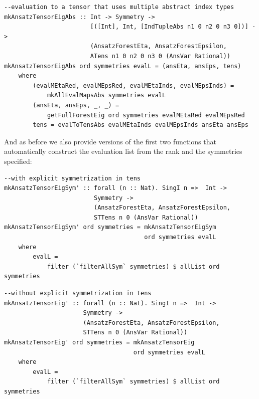 \documentclass[a4paper,12pt, DIV=14, BCOR=5mm, twoside, headsepline]{scrbook}
\begin{document}
\begin{samepage}
\begin{verbatim}
--evaluation to a tensor that uses multiple abstract index types
mkAnsatzTensorEigAbs :: Int -> Symmetry ->
                        [([Int], Int, [IndTupleAbs n1 0 n2 0 n3 0])] ->
                        (AnsatzForestEta, AnsatzForestEpsilon,
                        ATens n1 0 n2 0 n3 0 (AnsVar Rational))
mkAnsatzTensorEigAbs ord symmetries evalL = (ansEta, ansEps, tens)
    where
        (evalMEtaRed, evalMEpsRed, evalMEtaInds, evalMEpsInds) =
            mkAllEvalMapsAbs symmetries evalL 
        (ansEta, ansEps, _, _) =
            getFullForestEig ord symmetries evalMEtaRed evalMEpsRed
        tens = evalToTensAbs evalMEtaInds evalMEpsInds ansEta ansEps

\end{verbatim} 
\end{samepage}

And as before we also provide versions of the first two functions that automatically construct the evaluation list from the rank and the symmetries specified:

\begin{samepage}
\begin{verbatim}
--with explicit symmetrization in tens
mkAnsatzTensorEigSym' :: forall (n :: Nat). SingI n =>  Int ->
                         Symmetry ->
                         (AnsatzForestEta, AnsatzForestEpsilon,
                         STTens n 0 (AnsVar Rational))
mkAnsatzTensorEigSym' ord symmetries = mkAnsatzTensorEigSym
                                       ord symmetries evalL
    where
        evalL =
            filter (`filterAllSym` symmetries) $ allList ord symmetries
\end{verbatim} 
\end{samepage}

\begin{samepage}
\begin{verbatim}
--without explicit symmetrization in tens
mkAnsatzTensorEig' :: forall (n :: Nat). SingI n =>  Int ->
                      Symmetry ->
                      (AnsatzForestEta, AnsatzForestEpsilon,
                      STTens n 0 (AnsVar Rational))
mkAnsatzTensorEig' ord symmetries = mkAnsatzTensorEig
                                    ord symmetries evalL
    where
        evalL =
            filter (`filterAllSym` symmetries) $ allList ord symmetries
\end{verbatim} 
\end{samepage}
\end{document}
